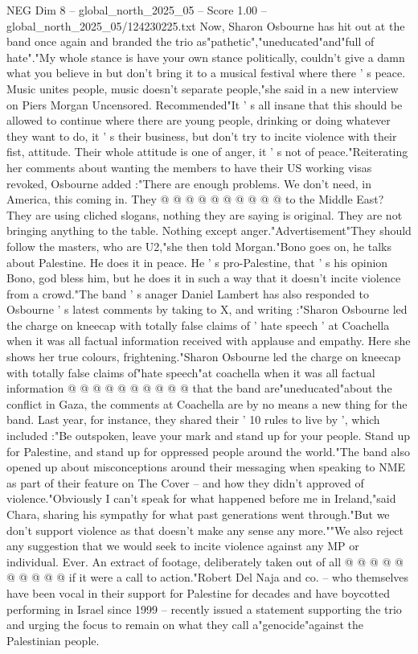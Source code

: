\begin{textsample}{NEG Dim 8 – global\_north\_2025\_05 – Score 1.00 – global\_north\_2025\_05/124230225.txt}  \label{ex:f8_neg_415}
Now, Sharon Osbourne has hit out at the band once again and branded the trio as"pathetic","uneducated"and"full of hate"."My whole stance is have your own stance politically, couldn't give a damn what you believe in but don't bring it to a musical festival where there ' s peace.
Music unites people, music doesn't separate people,"she said in a new interview on Piers Morgan Uncensored.
Recommended"It ' s all insane that this should be allowed to continue where there are young people, drinking or doing whatever they want to do, it ' s their business, but don't try to incite violence with their fist, attitude.
Their whole attitude is one of anger, it ' s not of peace."Reiterating her comments about wanting the members to have their US working visas revoked, Osbourne added :"There are enough problems.
We don't need, in America, this coming in.
They @ @ @ @ @ @ @ @ @ @ to the Middle East?
They are using cliched slogans, nothing they are saying is original.
They are not bringing anything to the table.
Nothing except anger."Advertisement"They should follow the masters, who are U2,"she then told Morgan."Bono goes on, he talks about Palestine.
He does it in peace.
He ' s pro-Palestine, that ' s his opinion Bono, god bless him, but he does it in such a way that it doesn't incite violence from a crowd."The band ' s anager Daniel Lambert has also responded to Osbourne ' s latest comments by taking to X, and writing :"Sharon Osbourne led the charge on kneecap with totally false claims of ' hate speech ' at Coachella when it was all factual information received with applause and empathy.
Here she shows her true colours, frightening."Sharon Osbourne led the charge on kneecap with totally false claims of"hate speech"at coachella when it was all factual information @ @ @ @ @ @ @ @ @ @ that the band are"uneducated"about the conflict in Gaza, the comments at Coachella are by no means a new thing for the band.
Last year, for instance, they shared their ' 10 rules to live by ', which included :"Be outspoken, leave your mark and stand up for your people.
Stand up for Palestine, and stand up for oppressed people around the world."The band also opened up about misconceptions around their messaging when speaking to NME as part of their feature on The Cover -- and how they didn't approved of violence."Obviously I can't speak for what happened before me in Ireland,"said Chara, sharing his sympathy for what past generations went through."But we don't support violence as that doesn't make any sense any more.""We also reject any suggestion that we would seek to incite violence against any MP or individual.
Ever.
An extract of footage, deliberately taken out of all @ @ @ @ @ @ @ @ @ @ if it were a call to action."Robert Del Naja and co. -- who themselves have been vocal in their support for Palestine for decades and have boycotted performing in Israel since 1999 -- recently issued a statement supporting the trio and urging the focus to remain on what they call a"genocide"against the Palestinian people.

\end{textsample}
